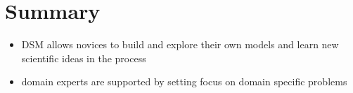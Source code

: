 \documentclass[runningheads,a4paper]{llncs}
\begin{document}
\section{Summary}\label{sec:summary}
\begin{itemize}
 \item DSM allows novices to build and explore 
their own models and learn new scientific ideas in the process
\item domain experts are supported by setting focus on domain specific problems
\end{itemize}

  
% 
% 
\nocite{*}



\end{document}
